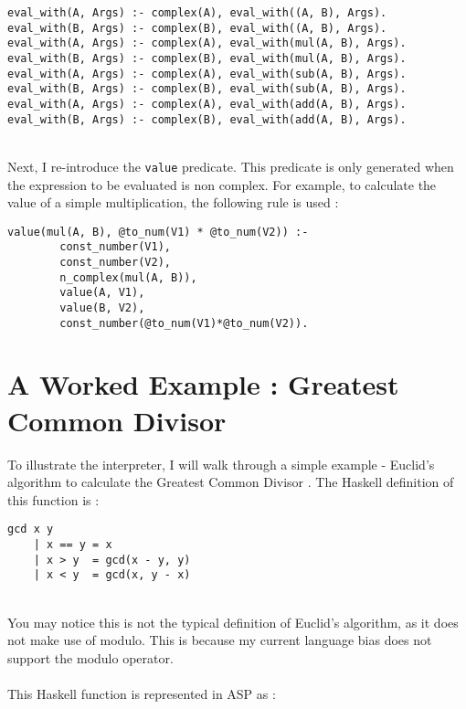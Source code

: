 \begin{lstlisting}[caption={Eval with modification}, label={lst:eval_mod}, firstnumber=78]
eval_with(A, Args) :- complex(A), eval_with((A, B), Args).
eval_with(B, Args) :- complex(B), eval_with((A, B), Args).
eval_with(A, Args) :- complex(A), eval_with(mul(A, B), Args).
eval_with(B, Args) :- complex(B), eval_with(mul(A, B), Args).
eval_with(A, Args) :- complex(A), eval_with(sub(A, B), Args).
eval_with(B, Args) :- complex(B), eval_with(sub(A, B), Args).
eval_with(A, Args) :- complex(A), eval_with(add(A, B), Args).
eval_with(B, Args) :- complex(B), eval_with(add(A, B), Args).
\end{lstlisting}
\mbox{}\\
Next, I re-introduce the \lstinline!value! predicate. This predicate is only generated when the expression to be evaluated is non complex. For example, to calculate the value of a simple multiplication, the following rule is used : 

\begin{lstlisting}[caption={Value with modification}, label={lst:value_mod}, firstnumber=69]
value(mul(A, B), @to_num(V1) * @to_num(V2)) :- 
		const_number(V1), 
		const_number(V2), 
		n_complex(mul(A, B)), 
		value(A, V1), 
		value(B, V2), 
		const_number(@to_num(V1)*@to_num(V2)).
\end{lstlisting}
\pagebreak

\section{A Worked Example : Greatest Common Divisor}

To illustrate the interpreter, I will walk through a simple example - Euclid's algorithm to calculate the Greatest Common Divisor \cite{Euclid}. The Haskell definition of this function is : \\

\begin{lstlisting}
gcd x y
	| x == y = x
	| x > y  = gcd(x - y, y)
	| x < y  = gcd(x, y - x)
\end{lstlisting}
\mbox{} \\
You may notice this is not the typical definition of Euclid's algorithm, as it does not make use of modulo. This is because my current language bias does not support the modulo operator. \\ \\
This Haskell function is represented in ASP as :\\

